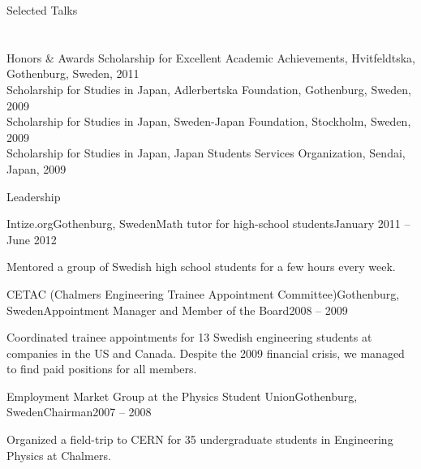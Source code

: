 \documentclass{resume}
\makeatletter
\newcommand\removebibheader
  {\xpatchcmd\std@thebibliography
    {\section*{\refname}%
     \@mkboth{\MakeUppercase\refname}{\MakeUppercase\refname}%
    }{}{}{}%
  }
\let\origsection\section%
\let\section\subsection%
\let\section\origsection%
\makeatother
\begin{document}

\begin{rsection}{Selected Talks}
{\removebibheader
{}
}
\end{rsection}


\begin{rsection}{Honors \& Awards}
  Scholarship for Excellent Academic Achievements, Hvitfeldtska, Gothenburg, Sweden, 2011\\%
  Scholarship for Studies in Japan, Adlerbertska Foundation, Gothenburg, Sweden, 2009\\%
  Scholarship for Studies in Japan, Sweden-Japan Foundation, Stockholm, Sweden, 2009\\%
  Scholarship for Studies in Japan, Japan Students Services Organization, Sendai, Japan, 2009%
\end{rsection}


\begin{rsection}{Leadership}

  \begin{rsubsection}{Intize.org}{Gothenburg, Sweden}{Math tutor for high-school students}{January 2011 -- June 2012}
  \item Mentored a group of Swedish high school students for a few hours every week.  
  \end{rsubsection}


  \begin{rsubsection}{CETAC (Chalmers Engineering Trainee Appointment Committee)}{Gothenburg, Sweden}{Appointment Manager and Member of the Board}{2008 -- 2009}
	\item Coordinated trainee appointments for 13 Swedish engineering students at companies in the US and Canada. Despite the 2009 financial crisis, we managed to find paid positions for all members. 
  \end{rsubsection}


  \begin{rsubsection}{Employment Market Group at the Physics Student Union}{Gothenburg, Sweden}{Chairman}{2007 -- 2008}
		\item Organized a field-trip to CERN for 35 undergraduate students in Engineering Physics at Chalmers.
  \end{rsubsection}

\end{rsection}
\end{document}

